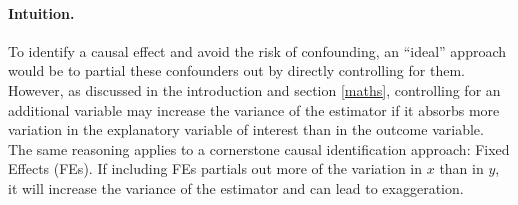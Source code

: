 \documentclass[usletter, 12pt]{article}
\begin{document}
     			\paragraph{Intuition.} To identify a causal effect and avoid the risk of confounding, an ``ideal'' approach would be to partial these confounders out by directly controlling for them. %
			However, as discussed in the introduction and section \ref{maths}, controlling for an additional variable may increase the variance of the estimator if it absorbs more variation in the explanatory variable of interest than in the outcome variable.
			The same reasoning applies to a cornerstone causal identification approach: Fixed Effects (FEs). If including FEs partials out more of the variation in $x$ than in $y$, it will increase the variance of the estimator and can lead to exaggeration. 
			
\end{document}
